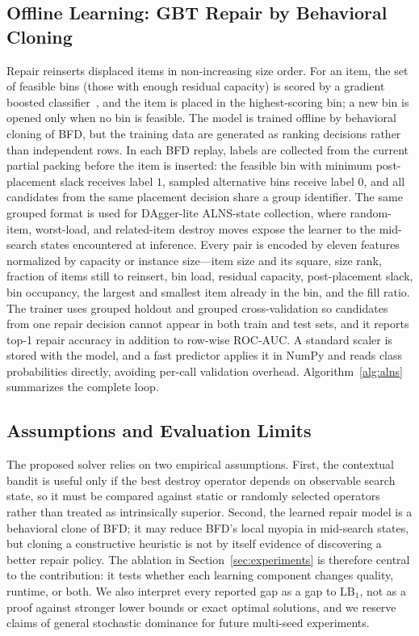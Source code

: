 \documentclass[conference]{IEEEtran}
\begin{document}
\subsection{Offline Learning: GBT Repair by Behavioral Cloning}
Repair reinserts displaced items in non-increasing size order. For an item, the
set of feasible bins (those with enough residual capacity) is scored by a gradient
boosted classifier~\cite{bFriedman}, and the item is placed in the highest-scoring
bin; a new bin is opened only when no bin is feasible. The model is trained offline
by behavioral cloning of BFD, but the training data are generated as ranking
decisions rather than independent rows. In each BFD replay, labels are collected
from the current partial packing before the item is inserted: the feasible bin
with minimum post-placement slack receives label $1$, sampled alternative bins
receive label $0$, and all candidates from the same placement decision share a
group identifier. The same grouped format is used for DAgger-lite ALNS-state
collection, where random-item, worst-load, and related-item destroy moves expose
the learner to the mid-search states encountered at inference. Every pair is
encoded by eleven features normalized by capacity or instance size---item size and
its square, size rank, fraction of items still to reinsert, bin load, residual
capacity, post-placement slack, bin occupancy, the largest and smallest item
already in the bin, and the fill ratio. The trainer uses grouped holdout and
grouped cross-validation so candidates from one repair decision cannot appear in
both train and test sets, and it reports top-1 repair accuracy in addition to
row-wise ROC-AUC. A standard scaler is stored with the model, and a fast predictor
applies it in NumPy and reads class probabilities directly, avoiding per-call
validation overhead. Algorithm~\ref{alg:alns} summarizes the complete loop.

\subsection{Assumptions and Evaluation Limits}
The proposed solver relies on two empirical assumptions. First, the contextual
bandit is useful only if the best destroy operator depends on observable search
state, so it must be compared against static or randomly selected operators rather
than treated as intrinsically superior. Second, the learned repair model is a
behavioral clone of BFD; it may reduce BFD's local myopia in mid-search states,
but cloning a constructive heuristic is not by itself evidence of discovering a
better repair policy. The ablation in Section~\ref{sec:experiments} is therefore
central to the contribution: it tests whether each learning component changes
quality, runtime, or both. We also interpret every reported gap as a gap to
$\mathrm{LB}_1$, not as a proof against stronger lower bounds or exact optimal
solutions, and we reserve claims of general stochastic dominance for future
multi-seed experiments.
\end{document}
